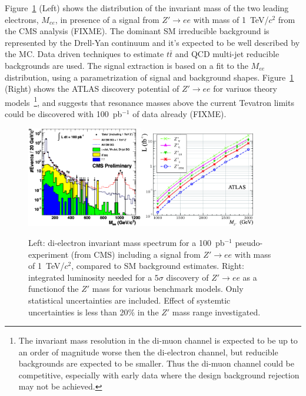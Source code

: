 \documentclass{cimento}
\begin{document}
Figure~\ref{fig:MeeAndZPrimeDisc} (Left) shows the distribution of 
the invariant mass of the two leading electrons, $M_{ee}$, in presence of 
a signal from $Z' \rightarrow ee$ with mass of 1~TeV/$c^2$ from the CMS analysis
(FIXME). The dominant SM irreducible background is represented by the Drell-Yan 
continuum and it's expected to be well described by the MC.
Data driven techniques to estimate $t\bar{t}$ and QCD multi-jet
reducible backgrounds are used. The signal extraction is based on a fit 
to the $M_{ee}$ distribution, using a parametrization of signal and 
background shapes. Figure~\ref{fig:MeeAndZPrimeDisc} (Right)
shows the ATLAS discovery potential of 
$Z' \rightarrow ee$ for variuos theory 
models~\footnote{The invariant mass resolution 
in the di-muon channel is expected to be up to an 
order of magnitude worse then the di-electron channel, but reducible backgrounds
are expected to be smaller. Thus the di-muon channel could be competitive, 
especially with early data where the design background rejection may not be 
achieved.}, and suggests that resonance masses 
above the current Tevatron limits could be discovered with 
100~pb$^{-1}$ of data already (FIXME). 

\begin{figure}[htbp] 
\centering
\includegraphics[width=0.45\textwidth]{st_mass_all_withZPrime_ALLTOPO.eps}\includegraphics[width=0.45\textwidth]{fig9L.eps}
\caption{Left: di-electron invariant mass spectrum for a 
100~pb$^{-1}$ pseudo-experiment (from CMS) including a signal from 
$Z' \rightarrow ee$ with mass of 1~TeV/$c^2$, 
compared to SM background estimates. Right: integrated 
luminosity needed for a $5\sigma$ discovery of $Z' \rightarrow ee$
as a functionof the $Z'$ mass for various benchmark models. Only 
statistical uncertainties are included. 
Effect of systemtic uncertainties is less than 20\% in the $Z'$ mass
range investigated.}
\label{fig:MeeAndZPrimeDisc}
\end{figure}
\end{document}
